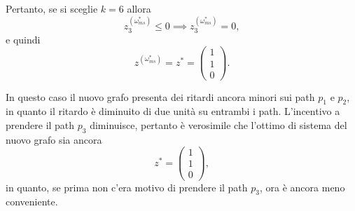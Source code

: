 \begin{alphaparts}
Pertanto, se si sceglie $k=6$ allora 
\[z_{3}^{(\omega_{ms}^{*})} \le 0 \implies  z_{3}^{(\omega_{ms}^{*})} = 0,\]
e quindi
\[z^{(\omega_{ms}^{*})} = z^{*}= \begin{pmatrix}
        				1 \\ 1 \\ 0
    			     \end{pmatrix}.\]
			     

    \questionpart
In questo caso il nuovo grafo presenta dei ritardi ancora minori sui path $p_1$ e $p_2$, in quanto il ritardo è diminuito di due unità su entrambi i path. L'incentivo a prendere il path $p_3$ diminuisce, pertanto è verosimile che l'ottimo di sistema del nuovo grafo sia ancora 
\[ z^{*} = \begin{pmatrix}
        1 \\ 1 \\ 0
    \end{pmatrix},\]
in quanto, se prima non c'era motivo di prendere il path $p_3$, ora è ancora meno conveniente.


\end{alphaparts}
